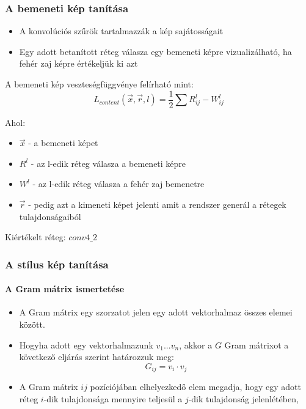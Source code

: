 \documentclass{beamer}
\begin{document}
	\begin{frame}
		\frametitle{A bemeneti kép tanítása}
		\begin{itemize}
			\item A konvolúciós szűrök tartalmazzák a kép sajátosságait
			\item Egy adott betanított réteg válasza egy bemeneti képre vizualizálható, ha fehér zaj képre értékeljük ki azt
		\end{itemize}
			
		A bemeneti kép veszteségfüggvénye felírható mint:
		\begin{equation}
			L_{content}(\vec{x}, \vec{r}, l) = \frac{1}{2}\sum{R^l_{ij} - W^l_{ij}}
		\end{equation}
		
		Ahol:
		\begin{itemize}
			\item \(\vec{x}\) - a bemeneti képet
			\item \(R^l\) - az l-edik réteg válasza a bemeneti képre
			\item \(W^l\) - az l-edik réteg válasza a fehér zaj bemenetre
			\item \(\vec{r}\) - pedig azt a kimeneti képet jelenti amit a rendszer generál a rétegek tulajdonságaiból
		\end{itemize}
		
		Kiértékelt réteg: \(conv4\_2\)
	
	\end{frame}

	\begin{frame}
		\frametitle{A stílus kép tanítása}
		\framesubtitle{A Gram mátrix ismertetése}
		
		\begin{itemize}
			\item A Gram mátrix egy szorzatot jelen egy adott vektorhalmaz összes elemei között.
			\item Hogyha adott egy vektorhalmazunk \(v_1...v_n\), akkor a \(G\) Gram mátrixot a következő eljárás szerint határozzuk meg:
				\begin{equation}
					G_{ij} = v_i \cdot v_j
				\end{equation}
			\item A Gram mátrix \(ij\) pozíciójában elhelyezkedő elem megadja, hogy egy adott réteg \(i\)-dik tulajdonsága mennyire teljesül a \(j\)-dik tulajdonság jelenlétében,
		\end{itemize}
	\end{frame}
\end{document}
